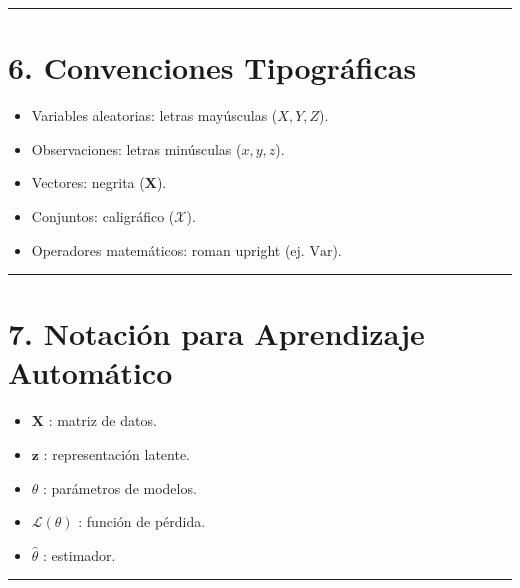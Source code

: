 \documentclass[letterpaper,10pt,english]{jupyterBook}
\begin{document}
\bigskip\hrule\bigskip



\section{6. Convenciones Tipográficas}
\label{\detokenize{00_frontmatter/notation:convenciones-tipograficas}}\begin{itemize}
\item {} 
\sphinxAtStartPar
Variables aleatorias: letras mayúsculas (\(X, Y, Z\)).

\item {} 
\sphinxAtStartPar
Observaciones: letras minúsculas (\(x, y, z\)).

\item {} 
\sphinxAtStartPar
Vectores: negrita (\(\mathbf{X}\)).

\item {} 
\sphinxAtStartPar
Conjuntos: caligráfico (\(\mathcal{X}\)).

\item {} 
\sphinxAtStartPar
Operadores matemáticos: roman upright (ej. \(\mathrm{Var}\)).

\end{itemize}


\bigskip\hrule\bigskip



\section{7. Notación para Aprendizaje Automático}
\label{\detokenize{00_frontmatter/notation:notacion-para-aprendizaje-automatico}}\begin{itemize}
\item {} 
\sphinxAtStartPar
\(\mathbf{X}\) : matriz de datos.

\item {} 
\sphinxAtStartPar
\(\mathbf{z}\) : representación latente.

\item {} 
\sphinxAtStartPar
\(\theta\) : parámetros de modelos.

\item {} 
\sphinxAtStartPar
\(\mathcal{L}(\theta)\) : función de pérdida.

\item {} 
\sphinxAtStartPar
\(\hat{\theta}\) : estimador.

\end{itemize}


\bigskip\hrule\bigskip
\end{document}
